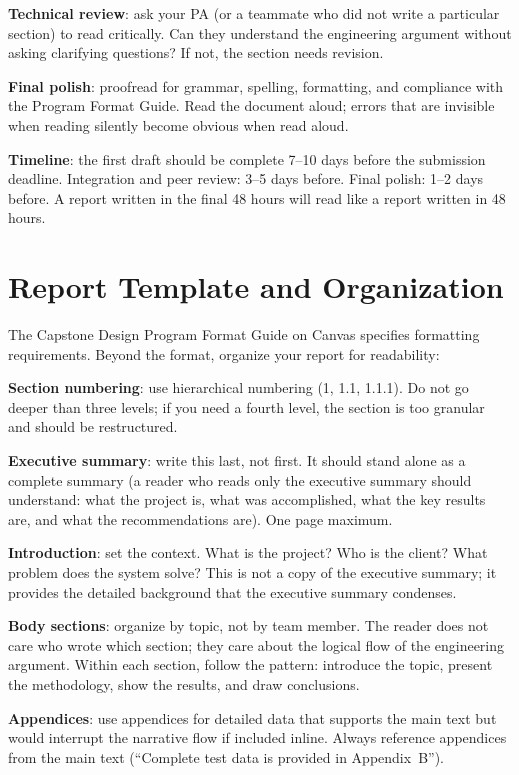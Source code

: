 \textbf{Technical review}: ask your PA (or a teammate who did not write a particular section) to read critically. Can they understand the engineering argument without asking clarifying questions? If not, the section needs revision.

\textbf{Final polish}: proofread for grammar, spelling, formatting, and compliance with the Program Format Guide. Read the document aloud; errors that are invisible when reading silently become obvious when read aloud.

\textbf{Timeline}: the first draft should be complete 7--10 days before the submission deadline. Integration and peer review: 3--5 days before. Final polish: 1--2 days before. A report written in the final 48 hours will read like a report written in 48 hours.

\section{Report Template and Organization}
The Capstone Design Program Format Guide on Canvas specifies formatting requirements. Beyond the format, organize your report for readability:

\textbf{Section numbering}: use hierarchical numbering (1, 1.1, 1.1.1). Do not go deeper than three levels; if you need a fourth level, the section is too granular and should be restructured.

\textbf{Executive summary}: write this last, not first. It should stand alone as a complete summary (a reader who reads only the executive summary should understand: what the project is, what was accomplished, what the key results are, and what the recommendations are). One page maximum.

\textbf{Introduction}: set the context. What is the project? Who is the client? What problem does the system solve? This is not a copy of the executive summary; it provides the detailed background that the executive summary condenses.

\textbf{Body sections}: organize by topic, not by team member. The reader does not care who wrote which section; they care about the logical flow of the engineering argument. Within each section, follow the pattern: introduce the topic, present the methodology, show the results, and draw conclusions.

\textbf{Appendices}: use appendices for detailed data that supports the main text but would interrupt the narrative flow if included inline. Always reference appendices from the main text (``Complete test data is provided in Appendix~B'').

